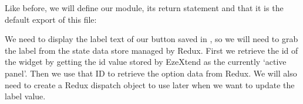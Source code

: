 \documentclass[letterpaper,10pt,english]{sphinxmanual}
\begin{document}
\begin{sphinxVerbatim}[commandchars=\\\{\},numbers=left,firstnumber=1,stepnumber=1]
\end{sphinxVerbatim}

\sphinxAtStartPar
Like before, we will define our module, its return statement and that it is the default export of this file:

\begin{sphinxVerbatim}[commandchars=\\\{\},numbers=left,firstnumber=1,stepnumber=1]


\end{sphinxVerbatim}

\sphinxAtStartPar
We need to display the label text of our button saved in , so we will need to grab the label from the state data store managed by Redux. First we retrieve the id of the widget by getting the id value stored by EzeXtend as the currently ‘active panel’. Then we use that ID to retrieve the option data from Redux. We will also need to create a Redux dispatch object to use later when we want to update the label value.
\end{document}

